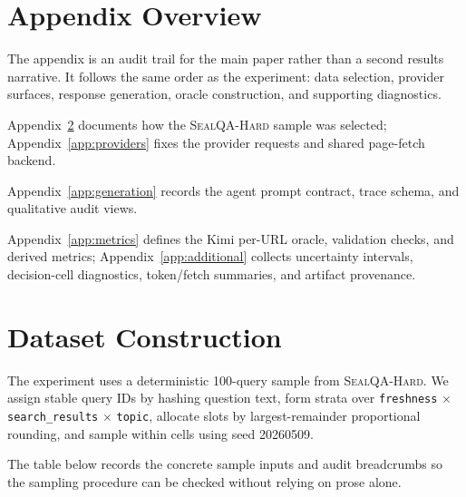 \section{Appendix Overview}
\label{app:overview}
The appendix is an audit trail for the main paper rather than a second results narrative. It follows the same order as the experiment: data selection, provider surfaces, response generation, oracle construction, and supporting diagnostics.

\begin{description}[leftmargin=0pt,itemsep=0.25em,topsep=0.25em]
\item[Data and providers.] Appendix~\ref{app:dataset} documents how the \textsc{SealQA-Hard} sample was selected; Appendix~\ref{app:providers} fixes the provider requests and shared page-fetch backend.
\item[Generation and traces.] Appendix~\ref{app:generation} records the agent prompt contract, trace schema, and qualitative audit views.
\item[Metrics and results.] Appendix~\ref{app:metrics} defines the Kimi per-URL oracle, validation checks, and derived metrics; Appendix~\ref{app:additional} collects uncertainty intervals, decision-cell diagnostics, token/fetch summaries, and artifact provenance.
\end{description}

\section{Dataset Construction}
\label{app:dataset}
The experiment uses a deterministic 100-query sample from \textsc{SealQA-Hard}. We assign stable query IDs by hashing question text, form strata over \texttt{freshness} $\times$ \texttt{search\_results} $\times$ \texttt{topic}, allocate slots by largest-remainder proportional rounding, and sample within cells using seed 20260509.

The table below records the concrete sample inputs and audit breadcrumbs so the sampling procedure can be checked without relying on prose alone.

